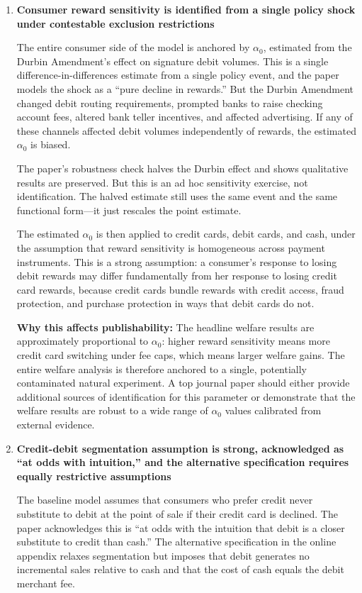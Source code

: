 \documentclass[11pt]{article}
\begin{document}
\begin{enumerate}[leftmargin=*]
    \item \textbf{Consumer reward sensitivity is identified from a single policy shock under contestable exclusion restrictions}

    The entire consumer side of the model is anchored by $\alpha_0$, estimated from the Durbin Amendment's effect on signature debit volumes. This is a single difference-in-differences estimate from a single policy event, and the paper models the shock as a ``pure decline in rewards.'' But the Durbin Amendment changed debit routing requirements, prompted banks to raise checking account fees, altered bank teller incentives, and affected advertising. If any of these channels affected debit volumes independently of rewards, the estimated $\alpha_0$ is biased.

    The paper's robustness check halves the Durbin effect and shows qualitative results are preserved. But this is an ad hoc sensitivity exercise, not identification. The halved estimate still uses the same event and the same functional form---it just rescales the point estimate.

    The estimated $\alpha_0$ is then applied to credit cards, debit cards, and cash, under the assumption that reward sensitivity is homogeneous across payment instruments. This is a strong assumption: a consumer's response to losing debit rewards may differ fundamentally from her response to losing credit card rewards, because credit cards bundle rewards with credit access, fraud protection, and purchase protection in ways that debit cards do not.

    \textbf{Why this affects publishability:} The headline welfare results are approximately proportional to $\alpha_0$: higher reward sensitivity means more credit card switching under fee caps, which means larger welfare gains. The entire welfare analysis is therefore anchored to a single, potentially contaminated natural experiment. A top journal paper should either provide additional sources of identification for this parameter or demonstrate that the welfare results are robust to a wide range of $\alpha_0$ values calibrated from external evidence.

    \item \textbf{Credit-debit segmentation assumption is strong, acknowledged as ``at odds with intuition,'' and the alternative specification requires equally restrictive assumptions}

    The baseline model assumes that consumers who prefer credit never substitute to debit at the point of sale if their credit card is declined. The paper acknowledges this is ``at odds with the intuition that debit is a closer substitute to credit than cash.'' The alternative specification in the online appendix relaxes segmentation but imposes that debit generates no incremental sales relative to cash and that the cost of cash equals the debit merchant fee.


\end{enumerate}
\end{document}
